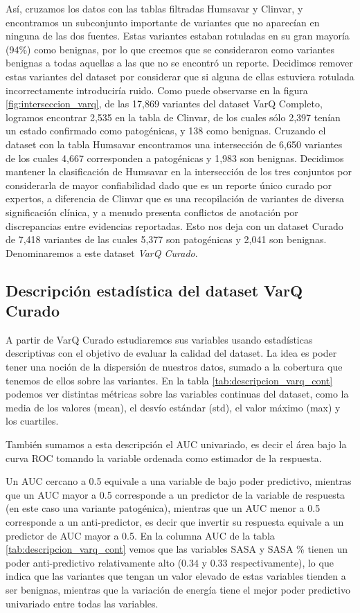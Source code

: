 Así, cruzamos los datos con las tablas filtradas Humsavar y Clinvar, y encontramos un subconjunto importante de variantes que no aparecían en ninguna de las dos fuentes. Estas variantes estaban rotuladas en su gran mayoría (94\%) como benignas, por lo que creemos que se consideraron como variantes benignas a todas aquellas a las que no se encontró un reporte. Decidimos remover estas variantes del dataset por considerar que si alguna de ellas estuviera rotulada incorrectamente introduciría ruido. Como puede observarse en la figura \ref{fig:interseccion_varq}, de las 17,869 variantes del dataset VarQ Completo, logramos encontrar 2,535 en la tabla de Clinvar, de los cuales sólo 2,397 tenían un estado confirmado como patogénicas, y 138 como benignas. Cruzando el dataset con la tabla Humsavar encontramos una intersección de 6,650 variantes de los cuales 4,667 corresponden a patogénicas y 1,983 son benignas. Decidimos mantener la clasificación de Humsavar en la intersección de los tres conjuntos por considerarla de mayor confiabilidad dado que es un reporte único curado por expertos, a diferencia de Clinvar que es una recopilación de variantes de diversa significación clínica, y a menudo presenta conflictos de anotación por discrepancias entre evidencias reportadas. Esto nos deja con un dataset Curado de 7,418 variantes de las cuales 5,377 son patogénicas y 2,041 son benignas. Denominaremos a este dataset \textit{VarQ Curado}. 


\subsection{Descripción estadística del dataset VarQ Curado}

A partir de VarQ Curado estudiaremos sus variables usando estadísticas descriptivas con el objetivo de evaluar la calidad del dataset. La idea es poder tener una noción de la dispersión de nuestros datos, sumado a la cobertura que tenemos de ellos sobre las variantes. En la tabla \ref{tab:descripcion_varq_cont} podemos ver distintas métricas sobre las variables continuas del dataset, como la media de los valores (mean), el desvío estándar (std), el valor máximo (max) y los cuartiles. 

También sumamos a esta descripción el AUC univariado, es decir el área bajo la curva ROC tomando la variable ordenada como estimador de la respuesta.   

Un AUC cercano a 0.5 equivale a una variable de bajo poder predictivo, mientras que un AUC mayor a 0.5 corresponde a un predictor de la variable de respuesta (en este caso una variante patogénica), mientras que un AUC menor a 0.5 corresponde a un anti-predictor, es decir que invertir su respuesta equivale a un predictor de AUC mayor a 0.5. En la columna AUC de la tabla \ref{tab:descripcion_varq_cont} vemos que las variables SASA y SASA \% tienen un poder anti-predictivo relativamente alto (0.34 y 0.33 respectivamente), lo que indica que las variantes que tengan un valor elevado de estas variables tienden a ser benignas, mientras que la variación de energía tiene el mejor poder predictivo univariado entre todas las variables.

